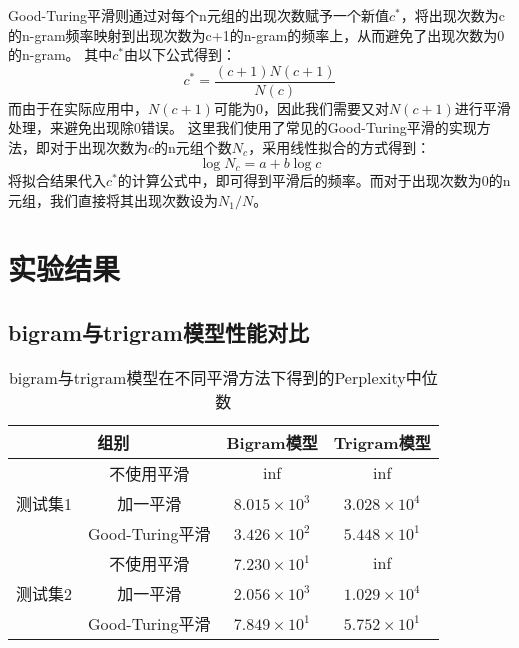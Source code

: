 \documentclass[twoside,11pt]{article}
\begin{document}
Good-Turing平滑则通过对每个n元组的出现次数赋予一个新值$c^*$，将出现次数为c的n-gram频率映射到出现次数为c+1的n-gram的频率上，从而避免了出现次数为0的n-gram。
其中$c^*$由以下公式得到：
\begin{equation}
  c^* = \frac{(c+1)N(c+1)}{N(c)}
\end{equation}
而由于在实际应用中，$N(c+1)$可能为0，因此我们需要又对$N(c+1)$进行平滑处理，来避免出现除0错误。
这里我们使用了常见的Good-Turing平滑的实现方法，即对于出现次数为$c$的n元组个数$N_c$，采用线性拟合的方式得到：
\begin{equation}
  \log N_c = a + b \log c
\end{equation}
将拟合结果代入$c^*$的计算公式中，即可得到平滑后的频率。而对于出现次数为0的n元组，我们直接将其出现次数设为$N_1/N$。


\section{实验结果}
\subsection{bigram与trigram模型性能对比}
\begin{table}[htbp]
  \renewcommand{\multirowsetup}{\centering}
  \caption{bigram与trigram模型在不同平滑方法下得到的Perplexity中位数}
  \label{tab:hyperparams}
  \vspace{5pt}
  \centering
  \begin{tabular}{cccc}
    \toprule
    \multicolumn{2}{c}{组别} & Bigram模型      & Trigram模型                               \\
    \midrule
    \multirow{3}{*}{测试集1} & 不使用平滑      & inf                 & inf                 \\
                             & 加一平滑        & $8.015 \times 10^3$ & $3.028 \times 10^4$ \\
                             & Good-Turing平滑 & $3.426 \times 10^2$ & $5.448 \times 10^1$ \\
    \midrule
    \multirow{3}{*}{测试集2} & 不使用平滑      & $7.230 \times 10^1$ & inf                 \\
                             & 加一平滑        & $2.056\times 10^3$  & $1.029 \times 10^4$ \\
                             & Good-Turing平滑 & $7.849 \times 10^1$ & $5.752 \times 10^1$ \\
    \bottomrule
  \end{tabular}
\end{table}
\end{document}
